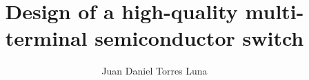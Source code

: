 \documentclass[whitelogo]{tudelft-report}
\begin{document}


\title[tudelft-black]{Design of a high-quality multi-terminal semiconductor switch}
\author[tudelft-black]{Juan Daniel Torres Luna}

\makecover[split]




%

\tableofcontents

\mainmatter









\end{document}
